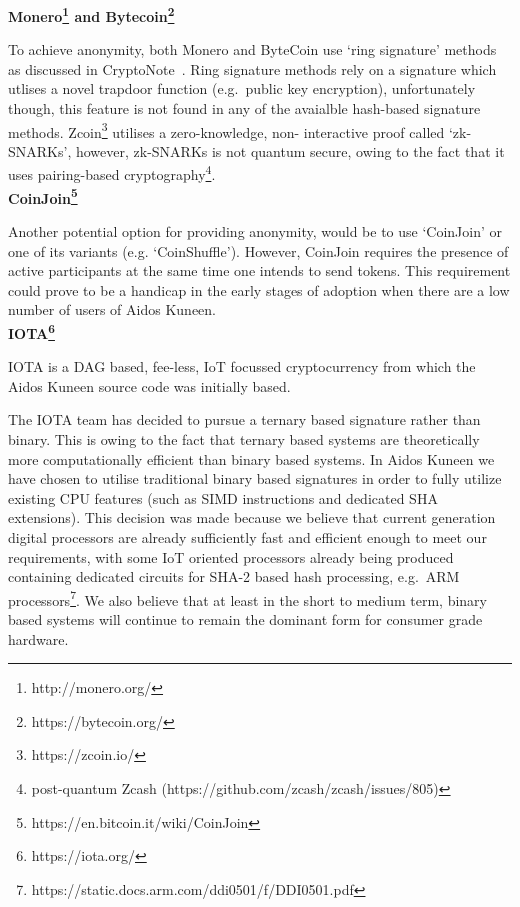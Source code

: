 \documentclass[a4paper,10pt,twocolumn]{article}
\begin{document}
{\bf Monero\footnote{http://monero.org/} and Bytecoin\footnote{https://bytecoin.org/}}

To achieve anonymity, both Monero and ByteCoin use `ring signature' methods as discussed in CryptoNote~\cite{ringsig}. Ring signature 
methods rely on a signature which utlises a novel trapdoor function (e.g.\ public key encryption), unfortunately though, this feature is 
not found in any of the avaialble hash-based signature methods. Zcoin\footnote{https://zcoin.io/} utilises a zero-knowledge, non-
interactive proof called `zk-SNARKs', however, zk-SNARKs is not quantum secure, owing to the fact that it uses pairing-based 
cryptography\footnote{post-quantum Zcash (https://github.com/zcash/zcash/issues/805)}. 
\\

\noindent
{\bf CoinJoin\footnote{https://en.bitcoin.it/wiki/CoinJoin}}

Another potential option for providing anonymity, would be to use `CoinJoin' or one of its variants (e.g. `CoinShuffle'). However, 
CoinJoin requires the presence of active participants at the same time one intends to send tokens. This requirement could prove to be a 
handicap in the early stages of adoption when there are a low number of users of Aidos Kuneen. 
\\

\noindent
{\bf IOTA\footnote{https://iota.org/}}

IOTA is a DAG based, fee-less, IoT focussed cryptocurrency from which the Aidos Kuneen source code was initially based. 

The IOTA team has decided to pursue a ternary based signature rather than binary. This is owing to the fact that ternary based 
systems are theoretically more computationally efficient than binary based systems. In Aidos Kuneen we have chosen to utilise 
traditional binary based signatures in order to fully utilize existing CPU features (such as SIMD instructions and dedicated SHA 
extensions). This decision was made because we believe that current generation digital processors are already sufficiently fast and 
efficient enough to meet our requirements, with some IoT oriented processors already being produced containing dedicated circuits for 
SHA-2 based hash processing, e.g.~ARM processors\footnote{https://static.docs.arm.com/ddi0501/f/DDI0501.pdf}. We also believe that at 
least in the short to medium term, binary based systems will continue to remain the dominant form for consumer grade hardware.
\end{document}
